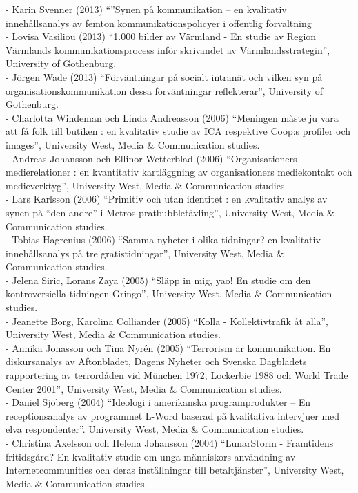 \documentclass[a4paper,11pt,oneside]{article}
\begin{document}
             - Karin Svenner (2013) ``''Synen på kommunikation – en kvalitativ innehållsanalys av femton kommunikationspolicyer i offentlig förvaltning\\
             - Lovisa Vasiliou (2013) ``1.000 bilder av Värmland - En studie av Region Värmlands kommunikationsprocess inför skrivandet av Värmlandsstrategin'', University of Gothenburg.\\
             - Jörgen Wade (2013) ``Förväntningar på socialt intranät och vilken syn på organisationskommunikation dessa förväntningar reflekterar'', University of Gothenburg.\\
             - Charlotta Windeman och Linda Andreasson (2006) ``Meningen måste ju vara att få folk till butiken : en kvalitativ studie av ICA respektive Coop:s profiler och images'',	University West, Media \& Communication studies. \\
             - Andreas Johansson och Ellinor Wetterblad (2006) ``Organisationers medierelationer : en kvantitativ kartläggning av organisationers mediekontakt och medieverktyg'',	University West, Media \& Communication studies. \\
             - Lars Karlsson (2006) ``Primitiv och utan identitet : en kvalitativ analys av synen på ``den andre'' i Metros pratbubbletävling'',	University West, Media \& Communication studies. \\
             - Tobias Hagrenius (2006) ``Samma nyheter i olika tidningar? en kvalitativ innehållsanalys på tre gratistidningar'',	University West, Media \& Communication studies. \\
             - Jelena Siric, Lorans Zaya (2005) ``Släpp in mig, yao! En studie om den kontroversiella tidningen Gringo'', 	University West, Media \& Communication studies. \\
             - Jeanette Borg, Karolina Colliander (2005) ``Kolla - Kollektivtrafik åt alla'',	University West, Media \& Communication studies. \\
             - Annika Jonasson och Tina Nyrén (2005) ``Terrorism är kommunikation. En diskursanalys av Aftonbladet, Dagens Nyheter och Svenska Dagbladets rapportering av terrordåden vid München 1972, Lockerbie 1988 och World Trade Center 2001'', University West, Media \& Communication studies. \\
             - Daniel Sjöberg (2004) ``Ideologi i amerikanska programprodukter – En receptionsanalys av programmet L-Word baserad på kvalitativa intervjuer med elva respondenter''. University West, Media \& Communication studies. \\
             - Christina Axelsson och Helena Johansson (2004) ``LunarStorm - Framtidens fritidsgård? En kvalitativ studie om unga människors användning av Internetcommunities och deras inställningar till betaltjänster'', University West, Media \& Communication studies. \\
\end{document}
